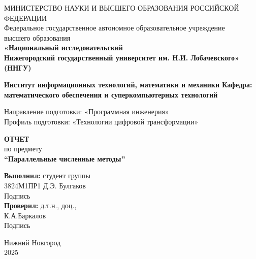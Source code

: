 \documentclass[12pt, russian]{extarticle}
\title{}
\author{}
\date{}
\begin{document}

\begin{titlepage}

    \begin{center}
        МИНИСТЕРСТВО НАУКИ И ВЫСШЕГО ОБРАЗОВАНИЯ РОССИЙСКОЙ ФЕДЕРАЦИИ \\
        Федеральное государственное автономное образовательное учреждение \\
        высшего образования \\
        \textbf{
            «Национальный исследовательский \\
            Нижегородский государственный университет им. Н.И. Лобачевского»\\ (ННГУ)
        }
    \bigbreak

    \vspace{2em}
        \textbf{
            Институт информационных технологий, математики и механики
            \bigbreak
            Кафедра: математического обеспечения и суперкомпьютерных технологий
        }

        Направление подготовки: «Программная инженерия» \\
        Профиль подготовки: «Технологии цифровой трансформации»

        \bigbreak
        \bigbreak
        \bigbreak

        \textbf{ОТЧЕТ} \\
        по предмету \\
        \textbf{
        ``Параллельные численные методы''}
        \bigbreak

    \end{center}

    \vspace{5em}

    \begin{flushright}
        {\bfseries Выполнил:} студент группы \\ 3824М1ПР1 Д.Э. Булгаков\\
        \hfill Подпись \hspace{5em} \newline \\
        {\bfseries Проверил:} д.т.н., доц.,\\ К.А.Баркалов \\
        \hfill Подпись \hspace{5em} \newline \\
    \end{flushright}


    \vspace{\fill}

    \begin{center}
        Нижний Новгород\\2025
    \end{center}

\end{titlepage}
\end{document}
